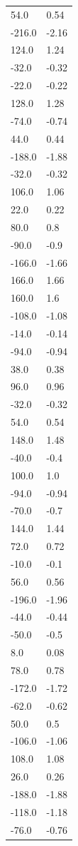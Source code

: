 \begin{longtable}{ll}
54.0 & 0.54 \\
-216.0 & -2.16 \\
124.0 & 1.24 \\
-32.0 & -0.32 \\
-22.0 & -0.22 \\
128.0 & 1.28 \\
-74.0 & -0.74 \\
44.0 & 0.44 \\
-188.0 & -1.88 \\
-32.0 & -0.32 \\
106.0 & 1.06 \\
22.0 & 0.22 \\
80.0 & 0.8 \\
-90.0 & -0.9 \\
-166.0 & -1.66 \\
166.0 & 1.66 \\
160.0 & 1.6 \\
-108.0 & -1.08 \\
-14.0 & -0.14 \\
-94.0 & -0.94 \\
38.0 & 0.38 \\
96.0 & 0.96 \\
-32.0 & -0.32 \\
54.0 & 0.54 \\
148.0 & 1.48 \\
-40.0 & -0.4 \\
100.0 & 1.0 \\
-94.0 & -0.94 \\
-70.0 & -0.7 \\
144.0 & 1.44 \\
72.0 & 0.72 \\
-10.0 & -0.1 \\
56.0 & 0.56 \\
-196.0 & -1.96 \\
-44.0 & -0.44 \\
-50.0 & -0.5 \\
8.0 & 0.08 \\
78.0 & 0.78 \\
-172.0 & -1.72 \\
-62.0 & -0.62 \\
50.0 & 0.5 \\
-106.0 & -1.06 \\
108.0 & 1.08 \\
26.0 & 0.26 \\
-188.0 & -1.88 \\
-118.0 & -1.18 \\
-76.0 & -0.76 \\

\end{longtable}
